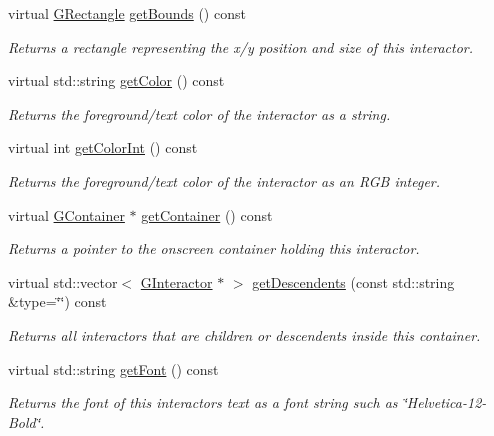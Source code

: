 \begin{DoxyCompactItemize}
virtual \mbox{\hyperlink{structGRectangle}{G\+Rectangle}} \mbox{\hyperlink{classGInteractor_a29e6ac35a0b48f491a4c88194cc5da3b}{get\+Bounds}} () const
\begin{DoxyCompactList}\small\item\em Returns a rectangle representing the x/y position and size of this interactor. \end{DoxyCompactList}\item 
virtual std\+::string \mbox{\hyperlink{classGInteractor_aa061dfa488c31e18549d64363c1d0e34}{get\+Color}} () const
\begin{DoxyCompactList}\small\item\em Returns the foreground/text color of the interactor as a string. \end{DoxyCompactList}\item 
virtual int \mbox{\hyperlink{classGInteractor_a9635c7af766cdc3417f346683fa0e6c1}{get\+Color\+Int}} () const
\begin{DoxyCompactList}\small\item\em Returns the foreground/text color of the interactor as an R\+GB integer. \end{DoxyCompactList}\item 
virtual \mbox{\hyperlink{classGContainer}{G\+Container}} $\ast$ \mbox{\hyperlink{classGInteractor_a7a6e317c29d61030929b4cd2d1c00fe7}{get\+Container}} () const
\begin{DoxyCompactList}\small\item\em Returns a pointer to the onscreen container holding this interactor. \end{DoxyCompactList}\item 
virtual std\+::vector$<$ \mbox{\hyperlink{classGInteractor}{G\+Interactor}} $\ast$ $>$ \mbox{\hyperlink{classGContainer_a9580b7f6ee0dc339f75bafd4e319f3ad}{get\+Descendents}} (const std\+::string \&type=\char`\"{}\char`\"{}) const
\begin{DoxyCompactList}\small\item\em Returns all interactors that are children or descendents inside this container. \end{DoxyCompactList}\item 
virtual std\+::string \mbox{\hyperlink{classGInteractor_a894a5502900794eeb27d084c21f1d77d}{get\+Font}} () const
\begin{DoxyCompactList}\small\item\em Returns the font of this interactor\textquotesingle{}s text as a font string such as \char`\"{}\+Helvetica-\/12-\/\+Bold\char`\"{}. \end{DoxyCompactList}\item 

\end{DoxyCompactItemize}
